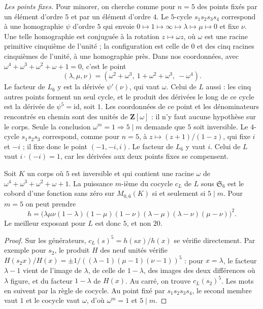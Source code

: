 \noindent\emph{Les points fixes.} Pour minorer, on cherche comme pour $n = 5$ des points fixés par un élément d'ordre $5$ et par un élément d'ordre $4$. Le $5$-cycle $s_1 s_2 s_3 s_4$ correspond à une homographie $\psi$ d'ordre $5$ qui envoie $0 \mapsto 1 \mapsto \infty \mapsto \lambda \mapsto \mu \mapsto 0$ et fixe $\nu$. Une telle homographie est conjuguée à la rotation $z \mapsto \omega z$, où $\omega$ est une racine primitive cinquième de l'unité ; la configuration est celle de $0$ et des cinq racines cinquièmes de l'unité, à une homographie près. Dans nos coordonnées, avec $\omega^4 + \omega^3 + \omega^2 + \omega + 1 = 0$, c'est le point
\[
(\lambda, \mu, \nu) = (\omega^2 + \omega^3,\ 1 + \omega^2 + \omega^3,\ -\omega^4).
\]
Le facteur de $L_6$ y est la dérivée $\psi'(\nu)$, qui vaut $\omega$. Celui de $L$ aussi : les cinq autres points forment un seul cycle, et le produit des dérivées le long de ce cycle est la dérivée de $\psi^5 = \mathrm{id}$, soit $1$. Les coordonnées de ce point et les dénominateurs rencontrés en chemin sont des unités de $\mathbf Z[\omega]$ : il n'y faut aucune hypothèse sur le corps. Seule la conclusion $\omega^m = 1 \Rightarrow 5 \mid m$ demande que $5$ soit inversible. Le $4$-cycle $s_1 s_2 s_3$ correspond, comme pour $n = 5$, à $z \mapsto (z + 1)/(1 - z)$, qui fixe $i$ et $-i$ ; il fixe donc le point $(-1, -i, i)$. Le facteur de $L_6$ y vaut $i$. Celui de $L$ vaut $i \cdot (-i) = 1$, car les dérivées aux deux points fixes se compensent.

\begin{encadre}
\begin{contrexemple}[page 70, colonne $n = 6$, pour $L$ : le \q{$20\,?$} n'est pas le meilleur exposant\piste{146-equivariant-trivialising-exponents}]\label{ce:146-cinq}
Soit $K$ un corps où $5$ est inversible et qui contient une racine $\omega$ de $\omega^4 + \omega^3 + \omega^2 + \omega + 1$. La puissance $m$-ième du cocycle $c_L$ de $L$ sous $\mathfrak S_6$ est le cobord d'une fonction sans zéro sur $M_{0,6}(K)$ si et seulement si $5 \mid m$. Pour $m = 5$ on peut prendre
\[
h = \bigl(\lambda\mu\nu(1 - \lambda)(1 - \mu)(1 - \nu)(\lambda - \mu)(\lambda - \nu)(\mu - \nu)\bigr)^2.
\]
Le meilleur exposant pour $L$ est donc $5$, et non $20$.
\end{contrexemple}
\end{encadre}

\begin{proof}
Sur les générateurs, $c_L(s)^5 = h(sx)/h(x)$ se vérifie directement. Par exemple pour $s_2$, le produit $H$ des neuf unités vérifie $H(s_2 x)/H(x) = \pm 1/((\lambda - 1)(\mu - 1)(\nu - 1))^5$ : pour $x = \lambda$, le facteur $\lambda - 1$ vient de l'image de $\lambda$, de celle de $1 - \lambda$, des images des deux différences où $\lambda$ figure, et du facteur $1 - \lambda$ de $H(x)$. Au carré, on trouve $c_L(s_2)^5$. Les mots en suivent par la règle de cocycle. Au point fixé par $s_1 s_2 s_3 s_4$, le second membre vaut $1$ et le cocycle vaut $\omega$, d'où $\omega^m = 1$ et $5 \mid m$.
\end{proof}

